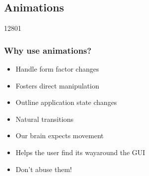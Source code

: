 %
%
%
%

\subsection{Animations}
\begin{slide}{12801}\frametitle{Why use animations?}


\begin{itemize}
\item Handle form factor changes
\item Fosters direct manipulation
\item Outline application state changes
\item Natural transitions
\item Our brain expects movement
\item Helps the user find its way\linebreak around the GUI
\item Don't abuse them!
\end{itemize}

\vspace*{2em}
\end{slide}


